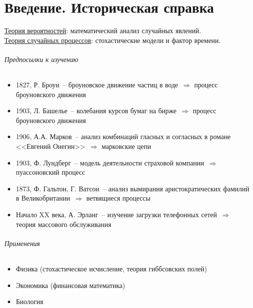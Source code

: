 

\ifdefined\Main\else

\fi

\part*{Введение. Историческая справка}
\underline{Теория вероятностей}: математический анализ случайных явлений.\\
\underline{Теория случайных процессов}: стохастические модели и фактор времени.

\paragraph{Предпосылки к изучению}
\begin{itemize}
\item 1827, Р. Броун~-- броуновское движение частиц в воде~$\Rightarrow$ процесс броуновского движения
\item 1903, Л. Башелье~-- колебания курсов бумаг на бирже~$\Rightarrow$ процесс броуновского движения
\item 1906, А.А. Марков~-- анализ комбинаций гласных и согласных в романе <<Евгений Онегин>>~$\Rightarrow$ марковские цепи
\item 1903, Ф. Лундберг~-- модель деятельности страховой компании~$\Rightarrow$ пуассоновский процесс
\item 1873, Ф. Гальтон, Г. Ватсон~-- анализ вымирания аристократических фамилий в Великобритании~$\Rightarrow$ ветвящиеся процессы
\item Начало XX века, А. Эрланг~-- изучение загрузки телефонных сетей~$\Rightarrow$ теория массового обслуживания
\end{itemize}

\paragraph{Применения}
\begin{itemize}
\item Физика (стохастическое исчисление, теория гиббсовских полей)
\item Экономика (финансовая математика)
\item Биология
\end{itemize}

\ifdefined\Main\else

\fi
